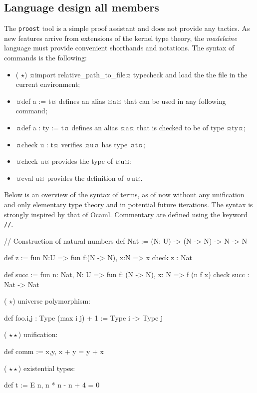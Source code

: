 \documentclass[twocolumn]{article}
\newcommand{\members}[1]{\texorpdfstring{\hfill\scriptsize #1}{}}
\newcommand{\etun}{({\color{Green} $\star$}) }
\newcommand{\etde}{({\color{Orange} $\star\star$}) }
\begin{document}
\subsection{Language design \members{all members}}
The \texttt{proost} tool is a simple proof assistant and does not provide any
tactics. As new features arrive from extensions of the kernel type theory, the
\emph{madelaine} language must provide convenient shorthands and notations. The syntax of commands is the following:
\begin{itemize}
  \item \etun¤import relative_path_to_file¤ typecheck and load the the file in the current environment;
  \item ¤def a := t¤ defines an alias ¤a¤ that can be used in any following command;
  \item ¤def a : ty := t¤ defines an alias ¤a¤ that is checked to be of type ¤ty¤;
  \item ¤check u : t¤ verifies ¤u¤ has type ¤t¤;
  \item ¤check u¤ provides the type of ¤u¤;
  \item ¤eval u¤ provides the definition of ¤u¤.\\
\end{itemize}

Below is an overview of the syntax of terms, as of now without any unification and only elementary type theory and in potential future iterations. The syntax is strongly inspired by that of Ocaml. Commentary are defined using the keyword \texttt{//}.
\begin{proost}
// Construction of natural numbers
def Nat :=
(N: U) -> (N -> N) -> N -> N

def z :=
fun N:U => fun f:(N -> N), x:N => x
check z : Nat

def succ := fun n: Nat, N: U =>
fun f: (N -> N), x: N => f (n f x)
check succ : Nat -> Nat
\end{proost}

\etun universe polymorphism:
\begin{proost}
def foo.{i,j} : Type (max i j) + 1
:= Type i -> Type j
\end{proost}

\etde unification:
\begin{proost}
def comm := \/ x,y, x + y = y + x
\end{proost}

\etde existential types:
\begin{proost}
def t := E n, n * n - n + 4 = 0
\end{proost}
\end{document}
